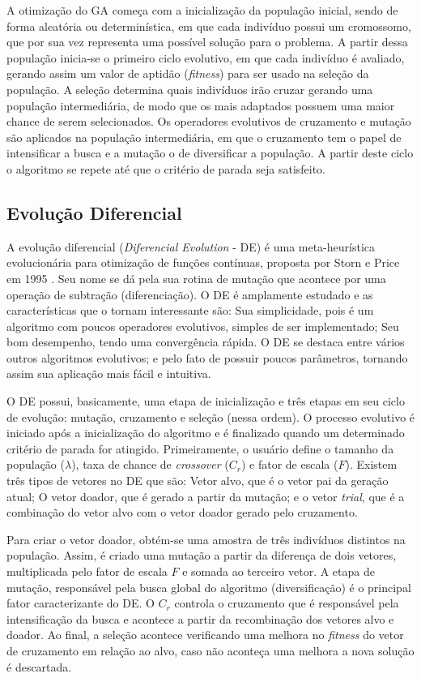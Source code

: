 A otimização do GA começa com a inicialização da população inicial, sendo de forma aleatória ou determinística, em que cada indivíduo possui um cromossomo, que por sua vez representa uma possível solução para o problema. A partir dessa população inicia-se o primeiro ciclo evolutivo, em que cada indivíduo é avaliado, gerando assim um valor de aptidão (\textit{fitness}) para ser usado na seleção da população. A seleção determina quais indivíduos irão cruzar gerando uma população intermediária, de modo que os mais adaptados possuem uma maior chance de serem selecionados. Os operadores evolutivos de cruzamento e mutação são aplicados na população intermediária, em que o cruzamento tem o papel de intensificar a busca e a mutação o de diversificar a população. A partir deste ciclo o algoritmo se repete até que o critério de parada seja satisfeito.

\subsection{Evolução Diferencial}
\label{sec:diferencial_evolution}
A evolução diferencial (\textit{Diferencial Evolution} - DE) é uma meta-heurística evolucionária para otimização de funções contínuas, proposta por Storn e Price em 1995 \cite{de}. Seu nome se dá pela sua rotina de mutação que acontece por uma operação de subtração (diferenciação). O DE é amplamente estudado e as características que o tornam interessante são: Sua simplicidade, pois é um algoritmo com poucos operadores evolutivos, simples de ser implementado; Seu bom desempenho, tendo uma convergência rápida. O DE se destaca entre vários outros algoritmos evolutivos; e pelo fato de possuir poucos parâmetros, tornando assim sua aplicação mais fácil e intuitiva.

O DE possui, basicamente, uma etapa de inicialização e três etapas em seu ciclo de evolução: mutação, cruzamento e seleção (nessa ordem). O processo evolutivo é iniciado após a inicialização do algoritmo e é finalizado quando um determinado critério de parada for atingido. Primeiramente, o usuário define o tamanho da população ($\lambda$), taxa de chance de \textit{crossover} ($C_r$) e fator de escala ($F$). Existem três tipos de vetores no DE que são: Vetor alvo, que é o vetor pai da geração atual; O vetor doador, que é gerado a partir da mutação; e o vetor \textit{trial}, que é a combinação do vetor alvo com o vetor doador gerado pelo cruzamento.

Para criar o vetor doador, obtém-se uma amostra de três indivíduos distintos na população. Assim, é criado uma mutação a partir da diferença de dois vetores, multiplicada pelo fator de escala $F$ e somada ao terceiro vetor. A etapa de mutação, responsável pela busca global do algoritmo (diversificação) é o principal fator caracterizante do DE. O $C_r$ controla o cruzamento que é responsável pela intensificação da busca e acontece a partir da recombinação dos vetores alvo e doador. Ao final, a seleção acontece verificando uma melhora no \textit{fitness} do vetor de cruzamento em relação ao alvo, caso não aconteça uma melhora a nova solução é descartada.

